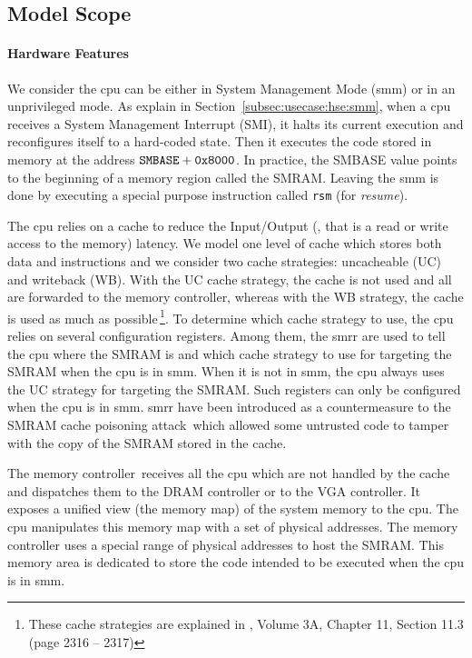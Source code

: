 \subsection{Model Scope}
\label{sec:speccert2:scope}

\paragraph{Hardware Features}
%
We consider the \ac{cpu} can be either in System Management Mode (\ac{smm}) or
in an unprivileged mode.
%
As explain in Section~\ref{subsec:usecase:hse:smm}, when a \ac{cpu} receives a
System Management Interrupt (SMI), it halts its current execution and
reconfigures itself to a hard-coded state.
%
Then it executes the code stored in memory at the address
$\mathtt{SMBASE} + \mathtt{0x8000}$.
%
In practice, the SMBASE value points to the beginning of a memory region called
the SMRAM.
%
Leaving the \ac{smm} is done by executing a special purpose instruction called
\texttt{rsm} (for \emph{resume}).

The \ac{cpu} relies on a cache to reduce the Input/Output (\IO, that is a read
or write access to the memory) latency.
%
We model one level of cache which stores both data and instructions and we
consider two cache strategies: uncacheable (UC) and writeback (WB).
%
With the UC cache strategy, the cache is not used and all \IOs are forwarded to
the memory controller, whereas with the WB strategy, the cache is used as much
as possible\,\footnote{These cache strategies are explained in
  \cite{intel2014manual}, Volume 3A, Chapter 11, Section 11.3 (page 2316 --
  2317)}.
%
To determine which cache strategy to use, the \ac{cpu} relies on several
configuration registers.
%
Among them, the \ac{smrr} are used to tell the \ac{cpu} where the SMRAM is and
which cache strategy to use for \IO targeting the SMRAM when the \ac{cpu} is in
\ac{smm}.
%
When it is not in \ac{smm}, the \ac{cpu} always uses the UC strategy for \IO
targeting the SMRAM.
%
Such registers can only be configured when the \ac{cpu} is in \ac{smm}.
%
\ac{smrr} have been introduced as a countermeasure to the SMRAM cache poisoning
attack\,\cite{wojtczuk2009smram,duflot2009smram} which allowed some untrusted
code to tamper with the copy of the SMRAM stored in the cache.
%

The memory controller\,\cite{intel2009mch} receives all the \ac{cpu} \IOs which
are not handled by the cache and dispatches them to the DRAM controller or to
the VGA controller.
%
It exposes a unified view (the memory map) of the system memory to the \ac{cpu}.
%
The \ac{cpu} manipulates this memory map with a set of physical addresses.
%
The memory controller uses a special range of physical addresses to host the
SMRAM.
%
This memory area is dedicated to store the code intended to be executed when the
\ac{cpu} is in \ac{smm}.

